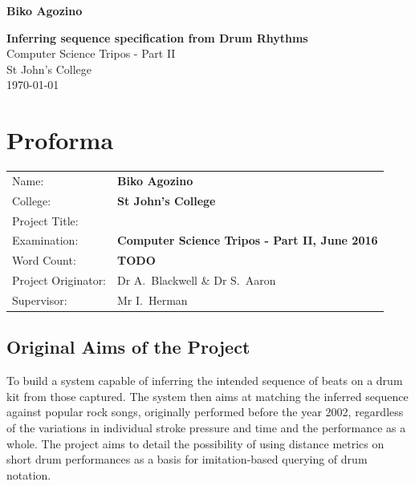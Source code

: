 \documentclass[12pt,twoside,notitlepage]{report}
\begin{document}


\pagestyle{empty}

\hfill{\LARGE \bf Biko Agozino}

\vspace*{60mm}
\begin{center}
\Huge
{\bf Inferring sequence specification from Drum Rhythms} \\
\vspace*{5mm}
Computer Science Tripos - Part II \\
\vspace*{5mm}
St John's College \\
\vspace*{5mm}
\today  %
\end{center}

\cleardoublepage


\setcounter{page}{1}
\pagestyle{plain}

\chapter*{Proforma}

{\large
\begin{tabular}{ll}
Name:               & \bf Biko Agozino                       \\
College:            & \bf St John's College                     \\
Project Title:      & \bf  \\
Examination:        & \bf Computer Science Tripos - Part II, June 2016       \\
Word Count:         & \bf TODO \\
Project Originator: & Dr A.~Blackwell \& Dr S.~Aaron                \\
Supervisor:         & Mr I.~Herman                    \\ 
\end{tabular}
}



\section*{Original Aims of the Project}

To build a system capable of inferring the intended sequence of beats on a drum kit from those captured. The system then aims at matching the inferred sequence against popular rock songs, originally performed before the year 2002, regardless of the variations in individual stroke pressure and time and the performance as a whole. The project aims to detail the possibility of using distance metrics on short drum performances as a basis for imitation-based querying of drum notation.
\end{document}
